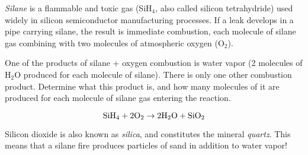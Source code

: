 

{\it Silane} is a flammable and toxic gas (SiH$_{4}$, also called silicon tetrahydride) used widely in silicon semiconductor manufacturing processes.  If a leak develops in a pipe carrying silane, the result is immediate combustion, each molecule of silane gas combining with two molecules of atmospheric oxygen (O$_{2}$).

One of the products of silane + oxygen combustion is water vapor (2 molecules of H$_{2}$O produced for each molecule of silane).  There is only one other combustion product.  Determine what this product is, and how many molecules of it are produced for each molecule of silane gas entering the reaction.







$$\hbox{SiH}_4 + 2\hbox{O}_2 \to 2\hbox{H}_2\hbox{O} + \hbox{SiO}_2$$

Silicon dioxide is also known as {\it silica}, and constitutes the mineral {\it quartz}.  This means that a silane fire produces particles of sand in addition to water vapor!











